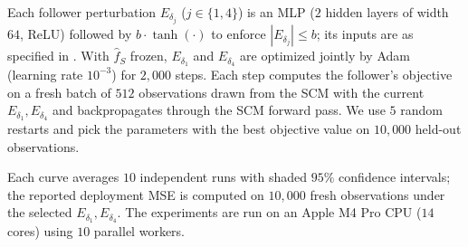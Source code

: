 Each follower perturbation $E_{\delta_j}$ ($j \in \{1, 4\}$) is an MLP ($2$ hidden layers of width $64$, ReLU) followed by $b \cdot \tanh(\cdot)$ to enforce $|E_{\delta_j}| \leq b$; its inputs are as specified in . With $\hat{f}_S$ frozen, $E_{\delta_1}$ and $E_{\delta_4}$ are optimized jointly by Adam (learning rate $10^{-3}$) for $2{,}000$ steps. Each step computes the follower's objective on a fresh batch of $512$ observations
drawn from the SCM with the current $E_{\delta_1}, E_{\delta_4}$ and backpropagates through the SCM forward pass. We use $5$ random restarts and pick the parameters with the best objective value on $10{,}000$ held-out observations.

 
Each curve averages $10$ independent runs with shaded $95\%$ confidence intervals; the reported deployment MSE is computed on $10{,}000$ 
fresh observations under the selected $E_{\delta_1}, E_{\delta_4}$. The experiments are run on an Apple M4 Pro CPU ($14$ cores) using $10$ parallel workers.





